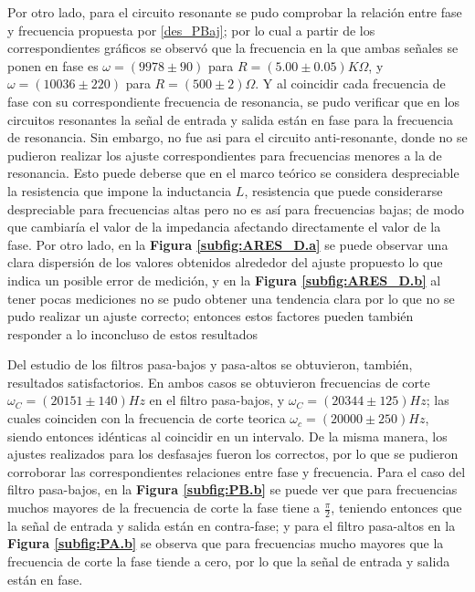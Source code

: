\documentclass[11pt,a4paper]{article}
\begin{document}
Por otro lado, para el circuito resonante se pudo comprobar la relación entre fase y frecuencia propuesta por \eqref{des_PBaj}; por lo cual a partir de los correspondientes gráficos se observó que la frecuencia en la que ambas señales se ponen en fase es $\omega = (9978 \pm 90)$ para $R=(5.00 \pm 0.05)K\Omega$, y $\omega = (10036 \pm 220)$ para $R=(500 \pm 2)\Omega$. Y al coincidir cada frecuencia de fase con su correspondiente frecuencia de resonancia, se pudo verificar que en los circuitos resonantes la señal de entrada y salida están en fase para la frecuencia de resonancia. Sin embargo, no fue asi para el circuito anti-resonante, donde no se pudieron realizar los ajuste correspondientes para frecuencias menores a la de resonancia. Esto puede deberse que en el marco teórico se considera despreciable la resistencia que impone la inductancia $L$, resistencia que puede considerarse despreciable para frecuencias altas pero no es así para frecuencias bajas; de modo que cambiaría el valor de la impedancia afectando directamente el valor de la fase. Por otro lado, en la \textbf{Figura \ref{subfig:ARES_D.a}} se puede observar una clara dispersión de los valores obtenidos alrededor del ajuste propuesto lo que indica un posible error de medición, y en la \textbf{Figura \ref{subfig:ARES_D.b}} al tener pocas mediciones no se pudo obtener una tendencia clara por lo que no se pudo realizar un ajuste correcto; entonces estos factores pueden también responder a lo inconcluso de estos resultados

Del estudio de los filtros pasa-bajos y pasa-altos se obtuvieron, también, resultados satisfactorios. En ambos casos se obtuvieron frecuencias de corte $\omega_C= (20151 \pm 140) Hz$ en el filtro pasa-bajos, y $\omega_C= (20344\pm125)Hz$; las cuales coinciden con la frecuencia de corte teorica $\omega_c = (20000 \pm 250) Hz$, siendo entonces idénticas al coincidir en un intervalo. De la misma manera, los ajustes realizados para los desfasajes fueron los correctos, por lo que se pudieron corroborar las correspondientes relaciones entre fase y frecuencia. Para el caso del filtro pasa-bajos, en la \textbf{Figura \ref{subfig:PB.b}} se puede ver que para frecuencias muchos mayores de la frecuencia de corte la fase tiene a $\frac{\pi}{2}$, teniendo entonces que la señal de entrada y salida están en contra-fase;  y para el filtro pasa-altos en la \textbf{Figura \ref{subfig:PA.b}} se observa que para frecuencias mucho mayores que la frecuencia de corte la fase tiende a cero, por lo que la señal de entrada y salida están en fase.
\end{document}

